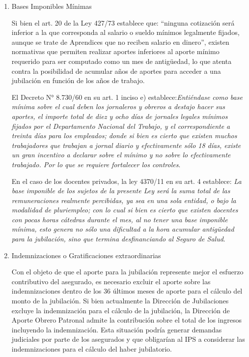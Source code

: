 \documentclass[a4paper,11pt]{article}
\begin{document}
\begin{enumerate}

   
    \item Bases Imponibles Mínimas

Si bien el art. 20 de la Ley 427/73 establece que: “ninguna cotización será inferior a la que corresponda al salario o sueldo mínimos legalmente fijados, aunque se trate de Aprendices que no reciben salario en dinero”, existen normativas que permiten realizar aportes inferiores al aporte mínimo requerido para ser computado como un mes de antigüedad, lo que atenta contra la posibilidad de acumular años de aportes para acceder a una jubilación en función de los años de trabajo.
 
El Decreto N° 8.730/60 en su art. 1 inciso e) establece:\textit {Entiéndase como base mínima sobre el cual deben los jornaleros y obreros a destajo hacer sus aportes, el importe total de diez y ocho días de jornales legales mínimos fijados por el Departamento Nacional del Trabajo, y el correspondiente a treinta días para los empleados; donde si bien es cierto que existen muchos trabajadores que trabajan a jornal diario y efectivamente sólo 18 días, existe un gran incentivo a declarar sobre el mínimo y no sobre lo efectivamente trabajado.  Por lo que se requiere fortalecer los controles}.

En el caso de los docentes privados, la ley 4370/11 en su art. 4 establece: \textit {La base imponible de los sujetos de la presente Ley será la suma total de las remuneraciones realmente percibidas, ya sea en una sola entidad, o bajo la modalidad de pluriempleo; con lo cual si bien es cierto que existen docentes con pocas horas cátedras durante el mes, al no tener una base imponible mínima, esto genera  no sólo una dificultad a la hora acumular antigüedad para la jubilación, sino que termina desfinanciando al Seguro de Salud}.

\item Indemnizaciones o Gratificaciones extraordinarias

Con el objeto de que el aporte para la jubilación represente mejor el esfuerzo contributivo del asegurado, es necesario excluir el aporte sobre las indemnizaciones dentro de los 36 últimos meses de aporte para el cálculo del monto de la jubilación. Si bien actualmente la Dirección de Jubilaciones excluye la indemnización para el cálculo de la jubilación, la Dirección de Aporte Obrero Patronal admite la contribución sobre el total de los ingresos incluyendo la indemnización. Esta situación podría generar demandas judiciales por parte de los asegurados y que obligarían al IPS a considerar las indemnizaciones para el cálculo del haber jubilatorio. 


\end{enumerate}
\end{document}
